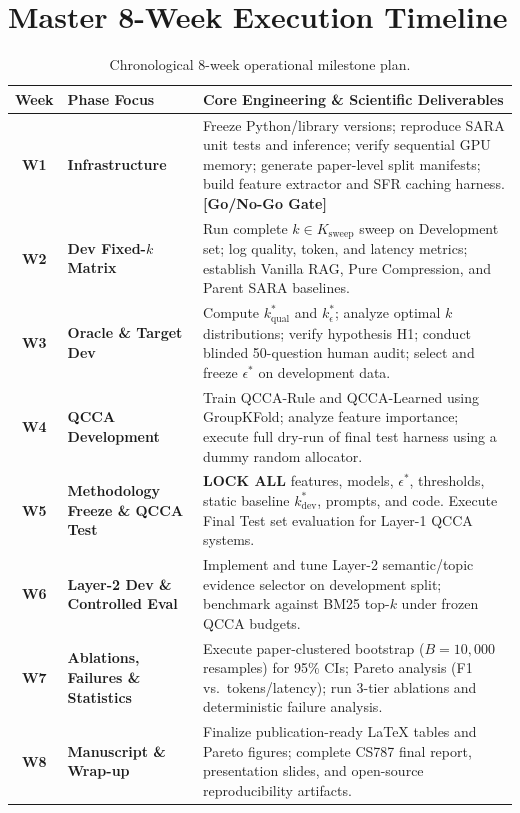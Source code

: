 \documentclass[11pt,a4paper]{article}
\begin{document}
\section{Master 8-Week Execution Timeline}
\begin{table}[H]
\centering
\small
\begin{tabularx}{\textwidth}{clX}
\toprule
\textbf{Week} & \textbf{Phase Focus} & \textbf{Core Engineering \& Scientific Deliverables} \\
\midrule
\textbf{W1} & \textbf{Infrastructure} & Freeze Python/library versions; reproduce SARA unit tests and inference; verify sequential GPU memory; generate paper-level split manifests; build feature extractor and SFR caching harness. \textbf{[Go/No-Go Gate]} \\
\addlinespace[2pt]
\textbf{W2} & \textbf{Dev Fixed-$k$ Matrix} & Run complete $k \in K_{\text{sweep}}$ sweep on Development set; log quality, token, and latency metrics; establish Vanilla RAG, Pure Compression, and Parent SARA baselines. \\
\addlinespace[2pt]
\textbf{W3} & \textbf{Oracle \& Target Dev} & Compute $k^*_{\text{qual}}$ and $k^*_\epsilon$; analyze optimal $k$ distributions; verify hypothesis H1; conduct blinded 50-question human audit; select and freeze $\epsilon^*$ on development data. \\
\addlinespace[2pt]
\textbf{W4} & \textbf{QCCA Development} & Train QCCA-Rule and QCCA-Learned using GroupKFold; analyze feature importance; execute full dry-run of final test harness using a dummy random allocator. \\
\addlinespace[2pt]
\textbf{W5} & \textbf{Methodology Freeze \& QCCA Test} & \textbf{LOCK ALL} features, models, $\epsilon^*$, thresholds, static baseline $k_{\text{dev}}^*$, prompts, and code. Execute Final Test set evaluation for Layer-1 QCCA systems. \\
\addlinespace[2pt]
\textbf{W6} & \textbf{Layer-2 Dev \& Controlled Eval} & Implement and tune Layer-2 semantic/topic evidence selector on development split; benchmark against BM25 top-$k$ under frozen QCCA budgets. \\
\addlinespace[2pt]
\textbf{W7} & \textbf{Ablations, Failures \& Statistics} & Execute paper-clustered bootstrap ($B=10{,}000$ resamples) for 95\% CIs; Pareto analysis (F1 vs.\ tokens/latency); run 3-tier ablations and deterministic failure analysis. \\
\addlinespace[2pt]
\textbf{W8} & \textbf{Manuscript \& Wrap-up} & Finalize publication-ready LaTeX tables and Pareto figures; complete CS787 final report, presentation slides, and open-source reproducibility artifacts. \\
\bottomrule
\end{tabularx}
\caption{Chronological 8-week operational milestone plan.}
\end{table}
\end{document}

